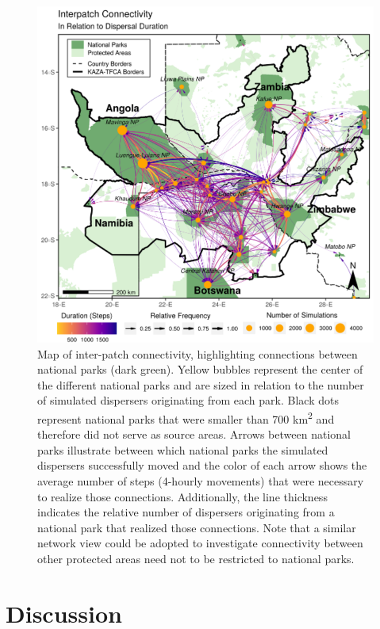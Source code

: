 \documentclass[abstract=on,10pt,a4paper,bibliography=totocnumbered]{article}
\begin{document}
\begin{figure}
  \includegraphics[width=\textwidth]{99_InterpatchConnectivity.png}
  \caption{Map of inter-patch connectivity, highlighting connections between
  national parks (dark green). Yellow bubbles represent the center of the
  different national parks and are sized in relation to the number of simulated
  dispersers originating from each park. Black dots represent national parks
  that were smaller than 700 km\textsuperscript{2} and therefore did not serve
  as source areas. Arrows between national parks illustrate between which
  national parks the simulated dispersers successfully moved and the color of
  each arrow shows the average number of steps (4-hourly movements) that were
  necessary to realize those connections. Additionally, the line thickness
  indicates the relative number of dispersers originating from a national park
  that realized those connections. Note that a similar network view could be
  adopted to investigate connectivity between other protected areas need not to
  be restricted to national parks.}
  \label{InterpatchConnectivity}
\end{figure}

\section{Discussion}
\end{document}
